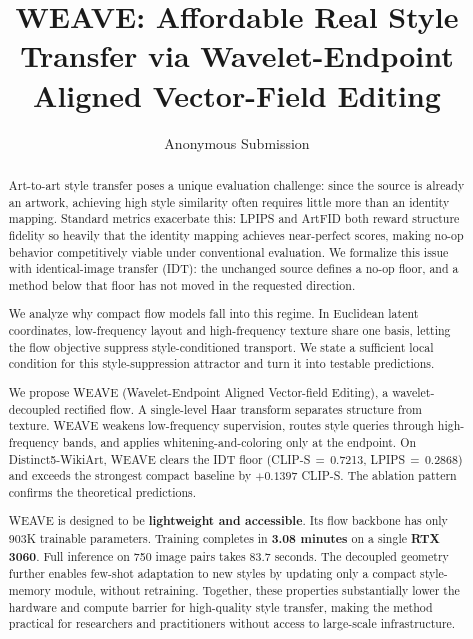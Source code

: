 \documentclass[letterpaper]{article}
\title{WEAVE: Affordable Real Style Transfer via Wavelet-Endpoint Aligned Vector-Field Editing }
\author{Anonymous Submission}
\begin{document}
\maketitle

\begin{abstract}
Art-to-art style transfer poses a unique evaluation challenge: since the source is already an artwork, achieving high style similarity often requires little more than an identity mapping.
Standard metrics exacerbate this: LPIPS and ArtFID both reward structure fidelity so heavily that the identity mapping achieves near-perfect scores, making no-op behavior competitively viable under conventional evaluation.
We formalize this issue with identical-image transfer (IDT): the unchanged source defines a no-op floor, and a method below that floor has not moved in the requested direction.

We analyze why compact flow models fall into this regime.
In Euclidean latent coordinates, low-frequency layout and high-frequency texture share one basis, letting the flow objective suppress style-conditioned transport.
We state a sufficient local condition for this style-suppression attractor and turn it into testable predictions.

We propose \textnormal{WEAVE} (Wavelet-Endpoint Aligned Vector-field Editing), a wavelet-decoupled rectified flow.
A single-level Haar transform separates structure from texture.
WEAVE weakens low-frequency supervision, routes style queries through high-frequency bands, and applies whitening-and-coloring only at the endpoint.
On Distinct5-WikiArt, WEAVE clears the IDT floor (CLIP-S\,$=$\,0.7213, LPIPS\,$=$\,0.2868) and exceeds the strongest compact baseline by $+0.1397$ CLIP-S.
The ablation pattern confirms the theoretical predictions.

WEAVE is designed to be \textbf{lightweight and accessible}.
Its flow backbone has only 903K trainable parameters.
Training completes in \textbf{3.08 minutes} on a single \textbf{RTX 3060}.
Full inference on 750 image pairs takes 83.7 seconds.
The decoupled geometry further enables few-shot adaptation to new styles by updating only a compact style-memory module, without retraining.
Together, these properties substantially lower the hardware and compute barrier for high-quality style transfer, making the method practical for researchers and practitioners without access to large-scale infrastructure.
\end{abstract}
\end{document}
